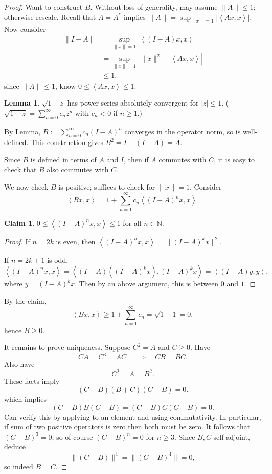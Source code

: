\documentclass[12pt]{article}
\theoremstyle{definition}
\newtheorem{lemma}{Lemma}
\newtheorem{claim}{Claim}
\newcommand{\N}{\mathbb{N}}
\newcommand{\<}{\left\langle}
\renewcommand{\>}{\right\rangle}
\begin{document}
\begin{proof}
    Want to construct $B$.
    Without loss of generality, may assume $\|A\| \leq 1$; otherwise rescale.
    Recall that $A = A^*$ implies $\|A\| = \sup_{\|x\| = 1}|\<Ax, x\>|$.
    Now consider
    \begin{align*}
        \|I - A\|
            &= \sup_{\|x\| = 1} |\<(I - A)x, x\>| \\
            &= \sup_{\|x\| = 1} \left|\|x\|^2 - \<Ax, x\>\right| \\
            &\leq 1,
    \end{align*}
    since $\|A\| \leq 1$, know $0 \leq \<Ax, x\> \leq 1$.

    \begin{lemma}
        $\sqrt{1 - z}$ has power series absolutely convergent for $|z| \leq 1$.
        ($\sqrt{1 - z} = \sum_{n=0}^{\infty} c_n z^n$ with $c_n < 0$ if $n \geq 1$.)
    \end{lemma}
    
    By Lemma, $B := \sum_{n=0}^{\infty} c_n (I - A)^n$ converges in the operator norm, so is well-defined.
    This construction gives $B^2 = I - (I - A) = A$.

    Since $B$ is defined in terms of $A$ and $I$, then if $A$ commutes with $C$, it is easy to check that $B$ also commutes with $C$.

    We now check $B$ is positive; suffices to check for $\|x\| = 1$.
    Consider
    \[
        \<Bx, x\> = 1 + \sum_{n=1}^{\infty} c_n\<(I - A)^nx, x\>.
    \]

    \begin{claim}
        $0 \leq \<(I - A)^nx, x\> \leq 1$ for all $n \in \N$.
    \end{claim}

    \begin{proof}
        If $n = 2k$ is even, then $\<(I - A)^nx, x\> = \|(I - A)^kx\|^2$.

        If $n = 2k + 1$ is odd,
        \[
            \<(I - A)^nx, x\>
                = \<(I - A)((I - A)^kx), (I - A)^kx\>
                = \<(I - A)y, y\>,
        \]
        where $y = (I - A)^kx$.
        Then by an above argument, this is between $0$ and $1$.
    \end{proof}

    By the claim,
    \[
        \<Bx, x\>
            \geq 1 + \sum_{n=1}^{\infty} c_n 
            = \sqrt{1 - 1}
            = 0,
    \]
    hence $B \geq 0$.

    It remains to prove uniqueness.
    Suppose $C^2 = A$ and $C \geq 0$.
    Have
    \[
        CA = C^3 = AC
        \quad\implies\quad
        CB = BC.
    \]
    Also have
    \[
        C^2 = A = B^2.
    \]
    These facts imply
    \[
        (C - B)(B + C)(C - B) = 0.
    \]
    which implies
    \[
        (C - B)B(C - B) = (C - B)C(C - B) = 0.
    \]
    Can verify this by applying to an element and using commutativity.
    In particular, if sum of two positive operators is zero then both must be zero.
    It follows that $(C - B)^3 = 0$, so of course $(C - B)^n = 0$ for $n \geq 3$.
    Since $B, C$ self-adjoint, deduce
    \[
        \|(C - B)\|^4 = \|(C - B)^4\| = 0,
    \]
    so indeed $B = C$.
\end{proof}
\end{document}
